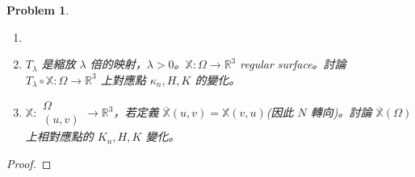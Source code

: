 \documentclass[10pt,a4paper]{article}
\newcounter{theProblemCounter}
\newtheorem{problem}[theProblemCounter]{Problem}
\begin{document}
\setcounter{theProblemCounter}{6}
\begin{problem}
\begin{enumerate}
\item[]
\item[(a)] $T_\lambda$ 是縮放 $\lambda$ 倍的映射，$\lambda>0$。$\mathbb{X}:\Omega\to \mathbb{R}^3$ regular surface。討論 $T_\lambda\circ \mathbb{X}:\Omega\to\mathbb{R}^3$ 上對應點 $\kappa_n, H, K$ 的變化。
\item[(b)] $\mathbb{X}:\begin{array}{c}\Omega\\(u,v)\end{array}\to \mathbb{R}^3$，若定義 $\overline{\mathbb{X}}(u, v)= \mathbb{X}(v, u)$(因此 $N$ 轉向)。討論 $\overline{\mathbb{X}}(\Omega)$ 上相對應點的 $K_n, H, K$ 變化。
\end{enumerate}
\end{problem}
\begin{proof}
\end{proof}
\end{document}
